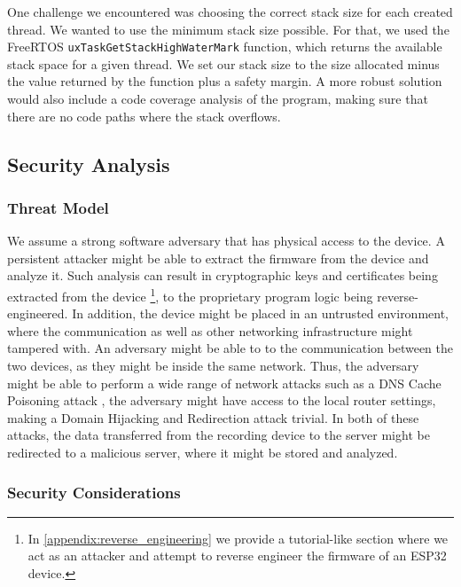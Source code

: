 \documentclass[conference]{IEEEtran}
\begin{document}
One challenge we encountered was choosing the correct stack size for each created thread.
We wanted to use the minimum stack size possible.
For that, we used the FreeRTOS \texttt{uxTaskGetStackHighWaterMark} function, which returns
the available stack space for a given thread.
We set our stack size to the size allocated minus the value returned by the function plus a safety margin.
A more robust solution would also include a code coverage analysis\cite{CodeCoverage} of the program,
making sure that there are no code paths where the stack overflows.

\subsection{Security Analysis}
\label{subsec:security_analysis}


\subsubsection{Threat Model}

We assume a strong software adversary that has physical access to the device.
A persistent attacker might be able to extract the firmware from the device and
analyze it. Such analysis can result in cryptographic keys and certificates being extracted from the device
\footnote{In \cref{appendix:reverse_engineering} we provide a tutorial-like section where we act as an attacker and attempt to reverse engineer the firmware of an ESP32 device.}, 
to the proprietary program logic being reverse-engineered.
In addition, the device might be placed in an untrusted environment, where the communication as well 
as other networking infrastructure might tampered with.
An adversary might be able to  to the communication between the two devices,
as they might be inside the same network.
Thus, the adversary might be able to perform a wide range of network attacks such 
as a DNS Cache Poisoning attack \cite{Dissanayake_2018}, the adversary might have access to the local router 
settings, making a Domain Hijacking and Redirection attack \cite{DnsHijacking} trivial. In both of these attacks, 
the data transferred from the recording device to the server might be redirected to a malicious server, 
where it might be stored and analyzed.

\subsubsection{Security Considerations}
\end{document}

